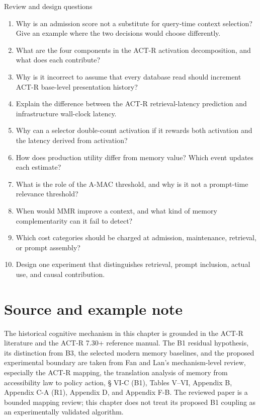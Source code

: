 \begin{reviewquestions}{Review and design questions}
\begin{enumerate}
  \item Why is an admission score not a substitute for query-time context selection? Give an example where the two decisions would choose differently.
  \item What are the four components in the ACT-R activation decomposition, and what does each contribute?
  \item Why is it incorrect to assume that every database read should increment ACT-R base-level presentation history?
  \item Explain the difference between the ACT-R retrieval-latency prediction and infrastructure wall-clock latency.
  \item Why can a selector double-count activation if it rewards both activation and the latency derived from activation?
  \item How does production utility differ from memory value? Which event updates each estimate?
  \item What is the role of the A-MAC threshold, and why is it not a prompt-time relevance threshold?
  \item When would MMR improve a context, and what kind of memory complementarity can it fail to detect?
  \item Which cost categories should be charged at admission, maintenance, retrieval, or prompt assembly?
  \item Design one experiment that distinguishes retrieval, prompt inclusion, actual use, and causal contribution.
\end{enumerate}
\end{reviewquestions}

\section*{Source and example note}

The historical cognitive mechanism in this chapter is grounded in the ACT-R literature and the ACT-R 7.30+ reference manual. The B1 residual hypothesis, its distinction from B3, the selected modern memory baselines, and the proposed experimental boundary are taken from Fan and Lan's mechanism-level review, especially the ACT-R mapping, the translation analysis of memory from accessibility law to policy action, § VI-C (B1), Tables V--VI, Appendix B, Appendix C-A (R1), Appendix D, and Appendix F-B. The reviewed paper is a bounded mapping review; this chapter does not treat its proposed B1 coupling as an experimentally validated algorithm.

